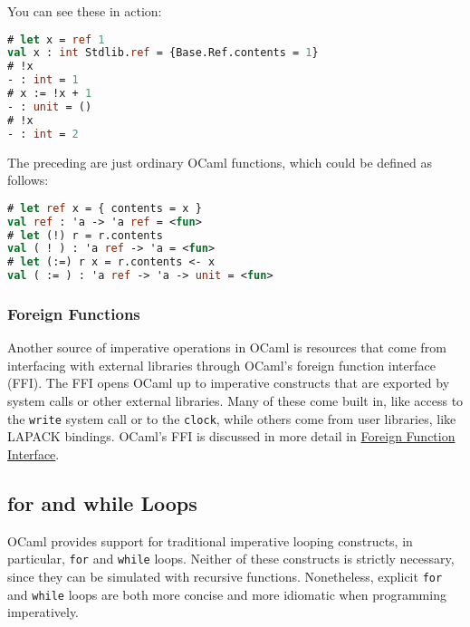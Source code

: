 You can see these in action:

\begin{lstlisting}[language=Caml]
# let x = ref 1
val x : int Stdlib.ref = {Base.Ref.contents = 1}
# !x
- : int = 1
# x := !x + 1
- : unit = ()
# !x
- : int = 2
\end{lstlisting}

The preceding are just ordinary OCaml functions, which could be defined
as follows:

\begin{lstlisting}[language=Caml]
# let ref x = { contents = x }
val ref : 'a -> 'a ref = <fun>
# let (!) r = r.contents
val ( ! ) : 'a ref -> 'a = <fun>
# let (:=) r x = r.contents <- x
val ( := ) : 'a ref -> 'a -> unit = <fun>
\end{lstlisting}

\hypertarget{foreign-functions}{%
\subsubsection{Foreign Functions}\label{foreign-functions}}

Another source of imperative operations in OCaml is resources that come
from interfacing with external libraries through OCaml's foreign
function interface (FFI). The FFI opens OCaml up to imperative
constructs that are exported by system calls or other external
libraries. Many of these come built in, like access to the
\passthrough{\lstinline!write!} system call or to the
\passthrough{\lstinline!clock!}, while others come from user libraries,
like LAPACK bindings. OCaml's FFI is discussed in more detail in
\href{foreign-function-interface.html\#foreign-function-interface}{Foreign
Function Interface}.

\hypertarget{for-and-while-loops-1}{%
\subsection{for and while Loops}\label{for-and-while-loops-1}}

OCaml provides support for traditional imperative looping constructs, in
particular, \passthrough{\lstinline!for!} and
\passthrough{\lstinline!while!} loops. Neither of these constructs is
strictly necessary, since they can be simulated with recursive
functions. Nonetheless, explicit \passthrough{\lstinline!for!} and
\passthrough{\lstinline!while!} loops are both more concise and more
idiomatic when programming imperatively.

